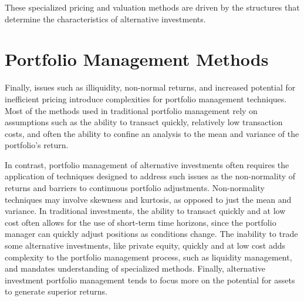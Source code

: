 \documentclass[11pt]{article}
\begin{document}
These specialized pricing and valuation methods are driven by the structures that determine the characteristics of alternative investments.

\section*{Portfolio Management Methods}
Finally, issues such as illiquidity, non-normal returns, and increased potential for inefficient pricing introduce complexities for portfolio management techniques. Most of the methods used in traditional portfolio management rely on assumptions such as the ability to transact quickly, relatively low transaction costs, and often the ability to confine an analysis to the mean and variance of the portfolio's return.

In contrast, portfolio management of alternative investments often requires the application of techniques designed to address such issues as the non-normality of returns and barriers to continuous portfolio adjustments. Non-normality techniques may involve skewness and kurtosis, as opposed to just the mean and variance. In traditional investments, the ability to transact quickly and at low cost often allows for the use of short-term time horizons, since the portfolio manager can quickly adjust positions as conditions change. The inability to trade some alternative investments, like private equity, quickly and at low cost adds complexity to the portfolio management process, such as liquidity management, and mandates understanding of specialized methods. Finally, alternative investment portfolio management tends to focus more on the potential for assets to generate superior returns.
\end{document}
